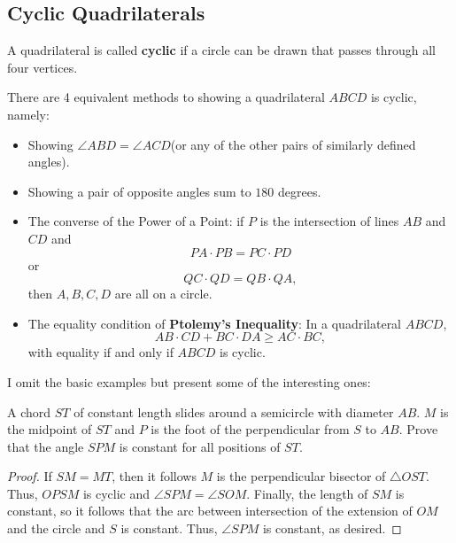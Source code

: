 \documentclass[12pt]{scrartcl}
\newcommand{\<}{\langle}
\renewcommand{\>}{\rangle}
\begin{document}
\subsection{Cyclic Quadrilaterals}
\begin{definition} A quadrilateral is called \textbf{cyclic} if a circle can be drawn that passes through all four vertices.
\end{definition}
There are 4 equivalent methods to showing a quadrilateral $ABCD$ is cyclic, namely:
\begin{itemize}
\item Showing $\angle ABD = \angle ACD$(or any of the other pairs of similarly defined angles).
\item Showing a pair of opposite angles sum to $180$ degrees.
\item The converse of the Power of a Point: if $P$ is the intersection of lines $AB$ and $CD$ and 
$$PA \cdot PB = PC \cdot PD$$
or 
$$QC \cdot QD = QB \cdot QA,$$
then $A, B, C, D$ are all on a circle.
\item The equality condition of \textbf{Ptolemy's Inequality}: In a quadrilateral $ABCD$, 
$$AB \cdot CD + BC \cdot DA \ge AC \cdot BC,$$
with equality if and only if $ABCD$ is cyclic.
\end{itemize}
I omit the basic examples but present some of the interesting ones:
\begin{proposition} A chord $ST$ of constant length slides around a semicircle with diameter $AB$.  $M$ is the midpoint of $ST$ and $P$ is the foot of the perpendicular from $S$ to $AB$.  Prove that the angle $SPM$ is constant for all positions of $ST$.
\end{proposition}
\begin{proof}
If $SM = MT$, then it follows $M$ is the perpendicular bisector of $\triangle OST$.  Thus, $OPSM$ is cyclic and $\angle SPM = \angle SOM$.  Finally, the length of $SM$ is constant, so it follows that the arc between intersection of the extension of $OM$ and the circle and $S$ is constant.  Thus, $\angle SPM$ is constant, as desired.
\end{proof}
\end{document}
